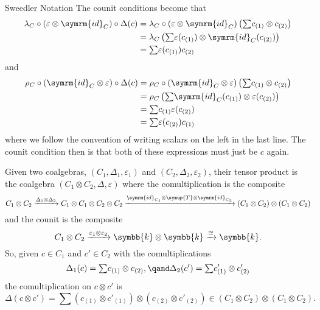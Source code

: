 \documentclass[fleqn]{NotesClass}
\newcommand{\switch}{\symup{T}}
\newcommand{\id}{\symrm{id}}
\newcommand{\isomorphic}{\cong}
\renewcommand{\field}{\symbb{k}}
\newcommand{\tsum}{{\textstyle \sum}}
\begin{document}
\begin{ntn}{Sweedler Notation}{}
        The counit conditions become that
        \begin{align}
            \lambda_C \circ (\varepsilon \otimes \id_C) \circ \Delta(c) &= \lambda_C \circ (\varepsilon \otimes \id_C) \left( \tsum c_{(1)} \otimes c_{(2)} \right)\\
            &= \lambda_C \left( \tsum \varepsilon(c_{(1)}) \otimes \id_C(c_{(2)}) \right)\\
            &= \tsum \varepsilon(c_{(1)}) c_{(2)}
        \end{align}
        and
        \begin{align}
            \rho_C \circ (\id_C \otimes \varepsilon) \circ \Delta(c) &= \rho_C \circ (\id_C \otimes \varepsilon) \left( \tsum c_{(1)} \otimes c_{(2)} \right)\\
            &= \rho_C \left( \tsum \id_C(c_{(1)}) \otimes \varepsilon(c_{(2)}) \right)\\
            &= \tsum c_{(1)} \varepsilon(c_{(2)})\\
            &= \tsum \varepsilon(c_{(2)}) c_{(1)}
        \end{align}
        where we follow the convention of writing scalars on the left in the last line.
        The counit condition then is that both of these expressions must just be \(c\) again.
    \end{ntn}
    
    Given two coalgebras, \((C_1, \Delta_1, \varepsilon_1)\) and \((C_2, \Delta_2, \varepsilon_2)\), their tensor product is the coalgebra \((C_1 \otimes C_2, \Delta, \varepsilon)\) where the comultiplication is the composite
    \begin{equation}
        C_1 \otimes C_2 \xrightarrow{\Delta_1 \otimes \Delta_2} C_1 \otimes C_1 \otimes C_2 \otimes C_2 \xrightarrow{\id_{C_1} \otimes \switch \otimes \id_{C_2}} (C_1 \otimes C_2) \otimes (C_1 \otimes C_2)
    \end{equation}
    and the counit is the composite
    \begin{equation}
        C_1 \otimes C_2 \xrightarrow{\varepsilon_1 \otimes \varepsilon_2} \field \otimes \field \xrightarrow{\isomorphic} \field.
    \end{equation}
    So, given \(c \in C_1\) and \(c' \in C_2\) with the comultiplications
    \begin{equation}
        \Delta_1(c) = \tsum c_{(1)} \otimes c_{(2)}, \qand \Delta_2(c') = \tsum c_{(1)}' \otimes c_{(2)}'
    \end{equation}
    the comultiplication on \(c \otimes c'\) is
    \begin{equation}
        \Delta(c \otimes c') = \tsum (c_{(1)} \otimes c'_{(1)}) \otimes (c_{(2)} \otimes c'_{(2)}) \in (C_1 \otimes C_2) \otimes (C_1 \otimes C_2).
    \end{equation}
    
\end{document}
